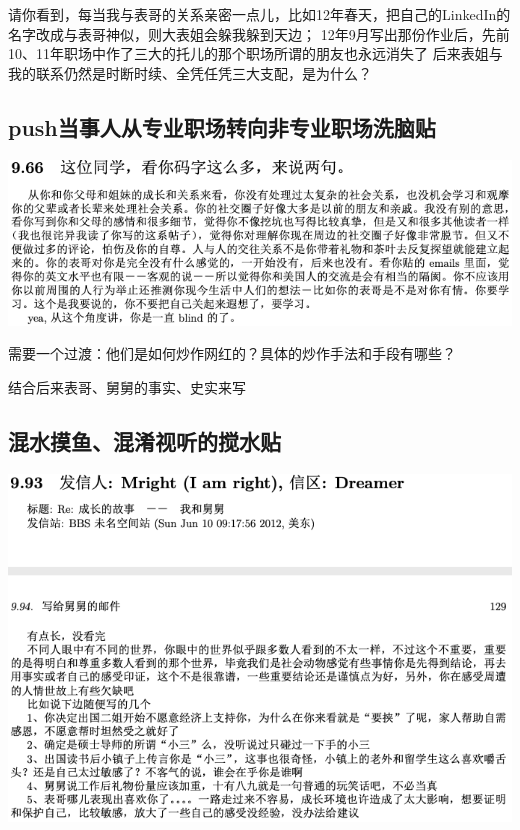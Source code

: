 \documentclass[9pt, b5paper]{article}
\begin{document}
请你看到，每当我与表哥的关系亲密一点儿，比如12年春天，把自己的LinkedIn的名字改成与表哥神似，则大表姐会躲我躲到天边；
12年9月写出那份作业后，先前10、11年职场中作了三大的托儿的那个职场所谓的朋友也永远消失了
后来表姐与我的联系仍然是时断时续、全凭任凭三大支配，是为什么？

\subsection{push当事人从专业职场转向非专业职场洗脑贴}
\label{sec:org8724a44}

\begin{center}
\includegraphics[width=.9\linewidth]{./pic/p1p115.png}
\end{center}

需要一个过渡：他们是如何炒作网红的？具体的炒作手法和手段有哪些？

结合后来表哥、舅舅的事实、史实来写

\subsection{混水摸鱼、混淆视听的搅水贴}
\label{sec:org2f3d9d3}

\begin{center}
\includegraphics[width=.9\linewidth]{./pic/p1p129-2.png}
\end{center}
\end{document}
